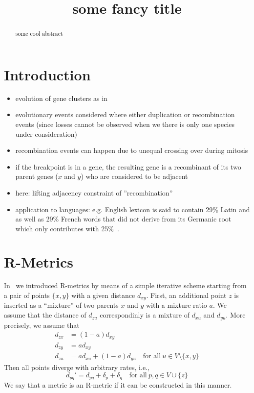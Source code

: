 \documentclass{article}
\newcommand{\TODO}[1]{\begingroup\color{red}#1\endgroup}
\begin{document}
\title{\TODO{some fancy title}}

\maketitle


\begin{abstract}
 some cool abstract
\end{abstract}

\section{Introduction}

\begin{itemize}
 \item evolution of gene clusters as in~\cite{Prohaska:17a}
 \item evolutionary events considered where either duplication 
 or recombination events (since losses cannot be observed when 
 we there is only one species under consideration)
 \item recombination events can happen due to unequal crossing
 over during mitosis
 \item if the breakpoint is in a gene, the resulting gene is
 a recombinant of its two parent genes ($x$ and $y$) who are
 considered to be adjacent
 \item here: lifting adjacency constraint of ''recombination''
 \item application to languages: e.g. English lexicon is said
 to contain 29\% Latin and as well as 29\% French words that 
 did not derive from its Germanic root which only contributes 
 with 25\%~\cite{Finkenstaedt:73}.
\end{itemize}


\section{R-Metrics} 

In~\cite{Prohaska:17a} we introduced R-metrics by means of a simple
iterative scheme starting from a pair of points $\{x,y\}$ with a given
distance $d_{xy}$.  First, an additional point $z$ is inserted as a
``mixture'' of two parents $x$ and $y$ with a mixture ratio $a$. We assume
that the distance of $d_{zu}$ correspondinly is a mixture of $d_{xu}$ and
$d_{yu}$. More precisely, we assume that
\begin{equation} 
\begin{split} 
  d_{zx} & = (1-a)  d_{xy} \\
  d_{zy} & =   a    d_{xy} \\
  d_{zu} & =   a    d_{xu} + (1-a)  d_{yu} \quad\textrm{for all}\ 
                     u\in V\setminus\{ x,y \}
\end{split}
\end{equation} 
Then all points diverge with arbitrary rates, i.e., 
\begin{equation} 
  d_{pq}' = d_{pq} + \delta_p + \delta_q \quad\textrm{for all}\ 
  p,q \in V\cup\{z\} 
\end{equation} 
We say that a metric is an R-metric if it can be constructed in this
manner.
\end{document}
